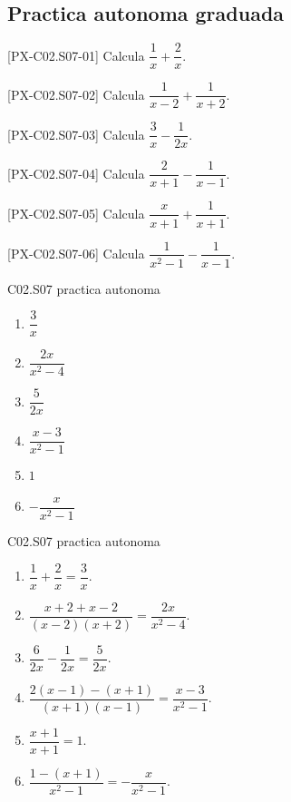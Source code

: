 \subsection*{Practica autonoma graduada}
\begin{exercise}{[PX-C02.S07-01] Calcula \(\dfrac{1}{x}+\dfrac{2}{x}\).}
\end{exercise}
\begin{exercise}{[PX-C02.S07-02] Calcula \(\dfrac{1}{x-2}+\dfrac{1}{x+2}\).}
\end{exercise}
\begin{exercise}{[PX-C02.S07-03] Calcula \(\dfrac{3}{x}-\dfrac{1}{2x}\).}
\end{exercise}
\begin{exercise}{[PX-C02.S07-04] Calcula \(\dfrac{2}{x+1}-\dfrac{1}{x-1}\).}
\end{exercise}
\begin{exercise}{[PX-C02.S07-05] Calcula \(\dfrac{x}{x+1}+\dfrac{1}{x+1}\).}
\end{exercise}
\begin{exercise}{[PX-C02.S07-06] Calcula \(\dfrac{1}{x^2-1}-\dfrac{1}{x-1}\).}
\end{exercise}

\begin{shortanswer}{C02.S07 practica autonoma}
\begin{enumerate}[label=\textbf{PX-C02.S07-\arabic*:}, leftmargin=*]
  \item \(\dfrac{3}{x}\)
  \item \(\dfrac{2x}{x^2-4}\)
  \item \(\dfrac{5}{2x}\)
  \item \(\dfrac{x-3}{x^2-1}\)
  \item \(1\)
  \item \(-\dfrac{x}{x^2-1}\)
\end{enumerate}
\end{shortanswer}

\begin{fullsolution}{C02.S07 practica autonoma}
\begin{enumerate}[label=\textbf{PX-C02.S07-\arabic*:}, leftmargin=*]
  \item \(\dfrac{1}{x}+\dfrac{2}{x}=\dfrac{3}{x}\).
  \item \(\dfrac{x+2+x-2}{(x-2)(x+2)}=\dfrac{2x}{x^2-4}\).
  \item \(\dfrac{6}{2x}-\dfrac{1}{2x}=\dfrac{5}{2x}\).
  \item \(\dfrac{2(x-1)-(x+1)}{(x+1)(x-1)}=\dfrac{x-3}{x^2-1}\).
  \item \(\dfrac{x+1}{x+1}=1\).
  \item \(\dfrac{1-(x+1)}{x^2-1}=-\dfrac{x}{x^2-1}\).
\end{enumerate}
\end{fullsolution}

